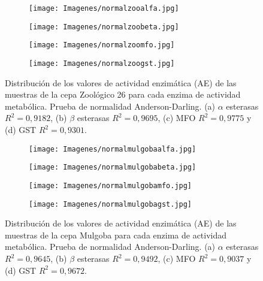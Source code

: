 \begin{figure}[h]
\begin{subfigure}{.5\textwidth}
	\centering
	\texttt{[image: Imagenes/normalzooalfa.jpg]}
	\caption{}
	\label{distralfa}
\end{subfigure}
\begin{subfigure}{.5\textwidth}
	\centering
	\texttt{[image: Imagenes/normalzoobeta.jpg]}
	\caption{}
	\label{distrbeta}
\end{subfigure}
\par\bigskip
\begin{subfigure}{.5\textwidth}
	\centering
	\texttt{[image: Imagenes/normalzoomfo.jpg]}
	\caption{}
	\label{distrmfo}
\end{subfigure}
\begin{subfigure}{.5\textwidth}
	\centering
	\texttt{[image: Imagenes/normalzoogst.jpg]}
	\caption{}
	\label{distrgst}
\end{subfigure}
\caption{Distribución de los valores de actividad enzimática (AE) de las muestras de la cepa Zoológico 26 para cada enzima de actividad metabólica. Prueba de normalidad Anderson-Darling. (a) $\alpha$ esterasas $R^{2}=0,9182$, (b) $\beta$ esterasas $R^{2}=0,9695$, (c) MFO $R^{2}=0,9775$ y (d) GST $R^{2}=0,9301$.}
\label{distribucion}
\end{figure}



\begin{figure}[h]
\begin{subfigure}{.5\textwidth}
	\centering
	\texttt{[image: Imagenes/normalmulgobaalfa.jpg]}
	\caption{}
	\label{distralfa}
\end{subfigure}
\begin{subfigure}{.5\textwidth}
	\centering
	\texttt{[image: Imagenes/normalmulgobabeta.jpg]}
	\caption{}
	\label{distrbeta}
\end{subfigure}
\par\bigskip
\begin{subfigure}{.5\textwidth}
	\centering
	\texttt{[image: Imagenes/normalmulgobamfo.jpg]}
	\caption{}
	\label{distrmfo}
\end{subfigure}
\begin{subfigure}{.5\textwidth}
	\centering
	\texttt{[image: Imagenes/normalmulgobagst.jpg]}
	\caption{}
	\label{distrgst}
\end{subfigure}
\caption{Distribución de los valores de actividad enzimática (AE) de las muestras de la cepa Mulgoba para cada enzima de actividad metabólica. Prueba de normalidad Anderson-Darling. (a) $\alpha$ esterasas $R^{2}=0,9645$, (b) $\beta$ esterasas $R^{2}=0,9492$, (c) MFO $R^{2}=0,9037$ y (d) GST $R^{2}=0,9672$.}
\label{distribucion}
\end{figure}
\clearpage

